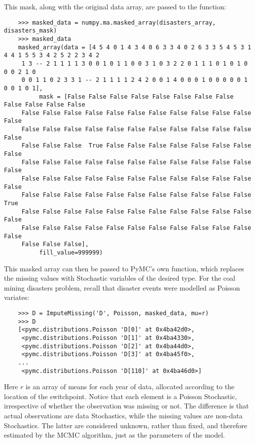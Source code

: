 This mask, along with the original data array, are passed to the  function:

\begin{verbatim}
	>>> masked_data = numpy.ma.masked_array(disasters_array, disasters_mask)
	>>> masked_data
	masked_array(data = [4 5 4 0 1 4 3 4 0 6 3 3 4 0 2 6 3 3 5 4 5 3 1 4 4 1 5 5 3 4 2 5 2 2 3 4 2
	 1 3 -- 2 1 1 1 1 3 0 0 1 0 1 1 0 0 3 1 0 3 2 2 0 1 1 1 0 1 0 1 0 0 0 2 1 0
	 0 0 1 1 0 2 3 3 1 -- 2 1 1 1 1 2 4 2 0 0 1 4 0 0 0 1 0 0 0 0 0 1 0 0 1 0 1],
	      mask = [False False False False False False False False False False False False
	 False False False False False False False False False False False False
	 False False False False False False False False False False False False
	 False False False  True False False False False False False False False
	 False False False False False False False False False False False False
	 False False False False False False False False False False False False
	 False False False False False False False False False False False  True
	 False False False False False False False False False False False False
	 False False False False False False False False False False False False
	 False False False],
	      fill_value=999999)
\end{verbatim}

This masked array can then be passed to PyMC's own  function, which replaces the missing values with Stochastic variables of the desired type. For the coal mining disasters problem, recall that disaster events were modelled as Poisson variates:

\begin{verbatim}
	>>> D = ImputeMissing('D', Poisson, masked_data, mu=r)
	>>> D
	[<pymc.distributions.Poisson 'D[0]' at 0x4ba42d0>,
	 <pymc.distributions.Poisson 'D[1]' at 0x4ba4330>,
	 <pymc.distributions.Poisson 'D[2]' at 0x4ba44d0>,
	 <pymc.distributions.Poisson 'D[3]' at 0x4ba45f0>,
	...
	 <pymc.distributions.Poisson 'D[110]' at 0x4ba46d0>]
\end{verbatim}

Here $r$ is an array of means for each year of data, allocated according to the location of the switchpoint. Notice that each element is a Poisson Stochastic, irrespective of whether the observation was missing or not. The difference is that actual observations are data Stochastics, while the missing values are non-data Stochastics. The latter are considered unknown, rather than fixed, and therefore estimated by the MCMC algorithm, just as the parameters of the model.

